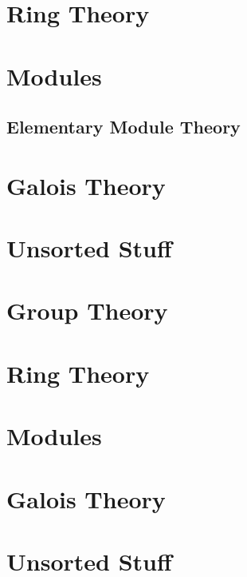 \documentclass{book}                                                           %
\newcommand*{\TOPPATH}{books}
\newcommand*{\PARPATH}{\TOPPATH/}
\newcommand*{\PATH}{\TOPPATH/}
\begin{document}
        \part{Ring Theory}
            \renewcommand{\PARPATH}{\TOPPATH/Algebra/Ring_Theory}
            
        \part{Modules}
            \renewcommand{\PARPATH}{\TOPPATH/Algebra/Modules}
            \chapter{Elementary  Module Theory}
                \renewcommand{\PATH}{\PARPATH/Elementary_Properties}
                \label{chapt:Elementary_Module_Theory}%
                
        \part{Galois Theory}
            \renewcommand{\PARPATH}{\TOPPATH/Algebra/Galois_Theory}
            
        \part{Unsorted Stuff}
            
            
            
            
            
    \else
        \part{Group Theory}
        \part{Ring Theory}
        \part{Modules}
        \part{Galois Theory}
        \part{Unsorted Stuff}
    \fi
    \clearpage
\end{document}
